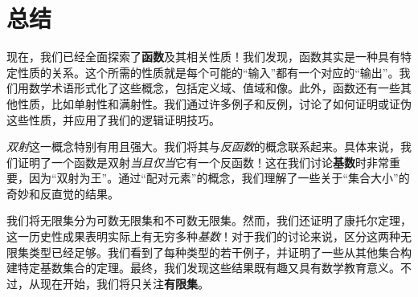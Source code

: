 \section{总结}

现在，我们已经全面探索了\textbf{函数}及其相关性质！我们发现，函数其实是一种具有特定性质的关系。这个所需的性质就是每个可能的``输入''都有一个对应的``输出''。我们用数学术语形式化了这些概念，包括定义域、值域和像。此外，函数还有一些其他性质，比如单射性和满射性。我们通过许多例子和反例，讨论了如何证明或证伪这些性质，并应用了我们的逻辑证明技巧。

\emph{双射}这一概念特别有用且强大。我们将其与\emph{反函数}的概念联系起来。具体来说，我们证明了一个函数是双射\emph{当且仅当}它有一个反函数！这在我们讨论\textbf{基数}时非常重要，因为``双射为王''。通过``配对元素''的概念，我们理解了一些关于``集合大小''的奇妙和反直觉的结果。

我们将无限集分为可数无限集和不可数无限集。然而，我们还证明了康托尔定理，这一历史性成果表明实际上有无穷多种\emph{基数}！对于我们的讨论来说，区分这两种无限集类型已经足够。我们看到了每种类型的若干例子，并证明了一些从其他集合构建特定基数集合的定理。最终，我们发现这些结果既有趣又具有数学教育意义。不过，从现在开始，我们将只关注\textbf{有限集}。

